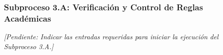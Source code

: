 \subsubsection{Subproceso 3.A: Verificación y Control de Reglas Académicas}

\textit{[Pendiente: Indicar las entradas requeridas para iniciar la ejecución del Subproceso 3.A.]}

